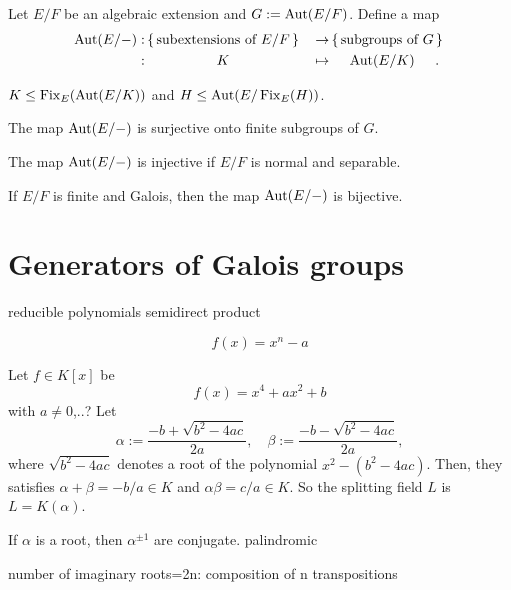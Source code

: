 \documentclass{../note}
\begin{document}
\begin{prb}
Let $E/F$ be an algebraic extension and $G:=\operatorname{Aut}(E/F)$.
Define a map
\begin{alignat*}{2}
\Aut(E/-)
:&\,\{\,\text{subextensions of $E/F$}\,\}\,&\to&\,\{\,\text{subgroups of $G$}\,\}\,\\
:&\omit\hfil$K$\hfil&\mapsto&\omit\hfil$\Aut(E/K)$\hfil.
\end{alignat*}
\begin{parts}
\item $K\le \operatorname{Fix}_E(\operatorname{Aut}(E/K))$ and $H\le\operatorname{Aut}(E/\operatorname{Fix}_E(H))$.
\item The map $\operatorname{Aut}(E/-)$ is surjective onto finite subgroups of $G$.
\item The map $\operatorname{Aut}(E/-)$ is injective if $E/F$ is normal and separable.
\item If $E/F$ is finite and Galois, then the map $\operatorname{Aut}(E/-)$ is bijective.
\end{parts}
\end{prb}


\section{Generators of Galois groups}


reducible polynomials
semidirect product


\begin{prb}
\[f(x)=x^n-a\]
\end{prb}

\begin{prb}
Let $f\in K[x]$ be
\[f(x)=x^4+ax^2+b\]
with $a\ne0$,..?
Let
\[\alpha:=\frac{-b+\sqrt{b^2-4ac}}{2a},\quad\beta:=\frac{-b-\sqrt{b^2-4ac}}{2a},\]
where $\sqrt{b^2-4ac}$ denotes a root of the polynomial $x^2-(b^2-4ac)$.
Then, they satisfies $\alpha+\beta=-b/a\in K$ and $\alpha\beta=c/a\in K$.
So the splitting field $L$ is $L=K(\alpha)$.
\end{prb}

\begin{prb}
If $\alpha$ is a root, then $\alpha^{\pm1}$ are conjugate.
palindromic
\end{prb}

\begin{prb}
number of imaginary roots=2n: composition of n transpositions
\end{prb}
\end{document}
